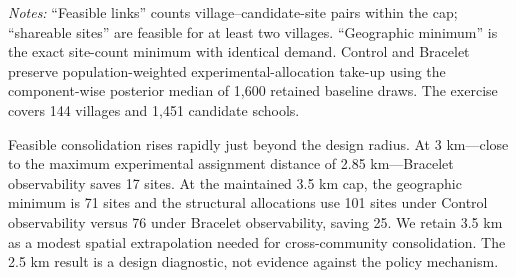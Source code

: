 \documentclass[12pt]{article}
\begin{document}
\begin{table}[htbp]
  \centering
  \small
  \begin{threeparttable}
    \caption{Distance caps and the geographic feasibility of site consolidation}
    \label{tab:policy-distance-cap-feasibility}
    
    \begin{tablenotes}[flushleft]
      \footnotesize
      \item \textit{Notes:} ``Feasible links'' counts village--candidate-site
      pairs within the cap; ``shareable sites'' are feasible for at least two
      villages. ``Geographic minimum'' is the exact site-count minimum with
      identical demand. Control and Bracelet preserve population-weighted
      experimental-allocation take-up using the component-wise posterior
      median of 1,600 retained baseline draws. The exercise covers 144
      villages and 1,451 candidate schools.
    \end{tablenotes}
  \end{threeparttable}
\end{table}

Feasible consolidation rises rapidly just beyond the design radius. At 3
km---close to the maximum experimental assignment distance of 2.85
km---Bracelet observability saves 17 sites. At the maintained 3.5 km cap, the
geographic minimum is 71 sites and the structural allocations use 101 sites
under Control observability versus 76 under Bracelet observability, saving 25.
We retain 3.5 km as a modest spatial extrapolation needed for cross-community
consolidation. The 2.5 km result is a design diagnostic, not evidence against
the policy mechanism.
\end{document}
